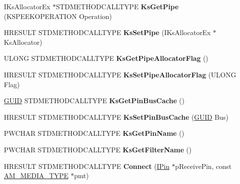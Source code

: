 \begin{DoxyCompactItemize}
I\+Ks\+Allocator\+Ex $\ast$S\+T\+D\+M\+E\+T\+H\+O\+D\+C\+A\+L\+L\+T\+Y\+PE {\bfseries Ks\+Get\+Pipe} (K\+S\+P\+E\+E\+K\+O\+P\+E\+R\+A\+T\+I\+ON Operation)
\item 
\mbox{\label{class_c_input_pin_ac186d852c669b609ec7213d377ce8991}} 
H\+R\+E\+S\+U\+LT S\+T\+D\+M\+E\+T\+H\+O\+D\+C\+A\+L\+L\+T\+Y\+PE {\bfseries Ks\+Set\+Pipe} (I\+Ks\+Allocator\+Ex $\ast$Ks\+Allocator)
\item 
\mbox{\label{class_c_input_pin_a0bee393396ce1f4eef98a850416d632a}} 
U\+L\+O\+NG S\+T\+D\+M\+E\+T\+H\+O\+D\+C\+A\+L\+L\+T\+Y\+PE {\bfseries Ks\+Get\+Pipe\+Allocator\+Flag} ()
\item 
\mbox{\label{class_c_input_pin_a8b02063cdf6cb2aa4049cb8c70d09816}} 
H\+R\+E\+S\+U\+LT S\+T\+D\+M\+E\+T\+H\+O\+D\+C\+A\+L\+L\+T\+Y\+PE {\bfseries Ks\+Set\+Pipe\+Allocator\+Flag} (U\+L\+O\+NG Flag)
\item 
\mbox{\label{class_c_input_pin_a41bd7ad6067967e324d3ded8fd7054b8}} 
\hyperlink{interface_g_u_i_d}{G\+U\+ID} S\+T\+D\+M\+E\+T\+H\+O\+D\+C\+A\+L\+L\+T\+Y\+PE {\bfseries Ks\+Get\+Pin\+Bus\+Cache} ()
\item 
\mbox{\label{class_c_input_pin_a7224e6f38df65115a1350f8e190ca13d}} 
H\+R\+E\+S\+U\+LT S\+T\+D\+M\+E\+T\+H\+O\+D\+C\+A\+L\+L\+T\+Y\+PE {\bfseries Ks\+Set\+Pin\+Bus\+Cache} (\hyperlink{interface_g_u_i_d}{G\+U\+ID} Bus)
\item 
\mbox{\label{class_c_input_pin_a49bf79a19007f775d57bf129494dc5ac}} 
P\+W\+C\+H\+AR S\+T\+D\+M\+E\+T\+H\+O\+D\+C\+A\+L\+L\+T\+Y\+PE {\bfseries Ks\+Get\+Pin\+Name} ()
\item 
\mbox{\label{class_c_input_pin_a1a99c06da0ead8fee065db00f7ffb0f6}} 
P\+W\+C\+H\+AR S\+T\+D\+M\+E\+T\+H\+O\+D\+C\+A\+L\+L\+T\+Y\+PE {\bfseries Ks\+Get\+Filter\+Name} ()
\item 
\mbox{\label{class_c_input_pin_af01cf24e7201fa159655aa9d8df38cef}} 
H\+R\+E\+S\+U\+LT S\+T\+D\+M\+E\+T\+H\+O\+D\+C\+A\+L\+L\+T\+Y\+PE {\bfseries Connect} (\hyperlink{interface_i_pin}{I\+Pin} $\ast$p\+Receive\+Pin, const \hyperlink{struct_a_m___m_e_d_i_a___t_y_p_e}{A\+M\+\_\+\+M\+E\+D\+I\+A\+\_\+\+T\+Y\+PE} $\ast$pmt)

\end{DoxyCompactItemize}
